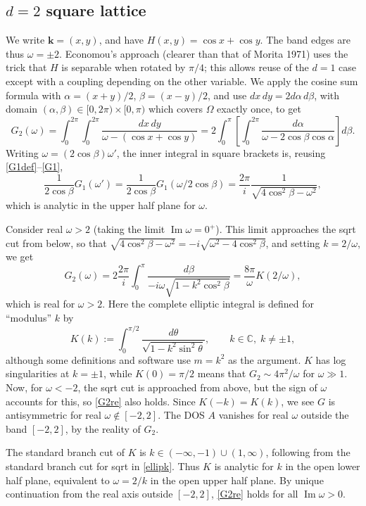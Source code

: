 \documentclass[11pt]{article}
\newcommand{\be}{\begin{equation}}
\newcommand{\ee}{\end{equation}}
\newcommand{\mbf}[1]{{\mathbf #1}}
\newcommand{\C}{\mathbb{C}}
\DeclareMathOperator{\im}{Im}
\newcommand{\om}{\omega}
\newcommand{\kk}{\mbf{k}}
\newcommand{\al}{\alpha}
\newcommand{\bt}{\beta}
\begin{document}
\subsection{$d=2$ square lattice}
\label{s:2d}

We write $\kk=(x,y)$, and have $H(x,y) = \cos x + \cos y$. The band edges
are thus $\om = \pm 2$.
Economou's approach (clearer than that of Morita 1971) uses the trick that
$H$ is separable when rotated by $\pi/4$; this allows reuse of the $d=1$
case except with a coupling depending on the other variable.
We apply the cosine sum formula with $\al = (x+y)/2$,
$\bt = (x-y)/2$, and use $dx\,dy = 2 d\al\,d\bt$, with domain
$(\al,\bt) \in [0,2\pi)\times[0,\pi)$ which covers $\Omega$ exactly once,
to get
\be
G_2(\om) = \int_0^{2\pi} \int_0^{2\pi} \frac{dx\,dy}{\om - (\cos x + \cos y)}
=
2 \int_0^{\pi} \left[ \int_0^{2\pi} \frac{d\al}{\om - 2\cos\bt\cos\al} \right]
d\bt.
\ee
Writing $\om=(2\cos\bt)\om'$, the inner integral in square brackets
is, reusing \eqref{G1def}--\eqref{G1},
\[
\frac{1}{2\cos\bt}G_1(\om') = 
\frac{1}{2\cos\bt}G_1(\om/2\cos\bt) =
\frac{2\pi}{i}\frac{1}{\sqrt{4\cos^2\bt - \om^2}},
\]
which is analytic in the upper half plane for $\om$.

Consider real $\om>2$ (taking the limit $\im \om = 0^+$).
This limit approaches the sqrt cut from below, so that
$\sqrt{4\cos^2\bt - \om^2} = -i\sqrt{\om^2 - 4\cos^2\bt}$, and
setting $k=2/\om$, we get
\be
G_2(\om) = 2 \frac{2\pi}{i} \int_0^{\pi} \frac{d\bt}{-i \om \sqrt{1-k^2\cos^2\bt}}
= \frac{8\pi}{\om}K(2/\om),
\label{G2re}
\ee
which is real for $\om>2$.
Here the complete elliptic integral is defined for ``modulus'' $k$ by
\be
K(k) := \int_0^{\pi/2} \frac{d\theta}{\sqrt{1-k^2\sin^2 \theta}},
\qquad k\in\C, \; k\neq \pm 1,
\label{ellipk}
\ee
although some definitions and software use $m=k^2$ as the argument.
$K$ has log singularities at $k=\pm 1$, while $K(0) = \pi/2$
means that $G_2 \sim 4\pi^2/\om$ for $\om\gg 1$.
Now, for $\om<-2$, the sqrt cut is approached from above,
but the sign of $\om$ accounts for this, so \eqref{G2re} also holds.
Since $K(-k) = K(k)$, we see $G$ is antisymmetric for real $\om\notin[-2,2]$.
The DOS $A$
vanishes for real $\om$ outside the band $[-2,2]$, by the reality of $G_2$.

The standard branch cut of $K$ is $k\in(-\infty,-1)\cup (1,\infty)$,
following from the standard
branch cut for sqrt in \eqref{ellipk}.
Thus $K$ is analytic for $k$ in the open lower half plane,
equivalent to $\om = 2/k$ in the open upper half plane.
By unique continuation from the real axis outside $[-2,2]$,
\eqref{G2re} holds for all $\im \om >0$.
\end{document}
